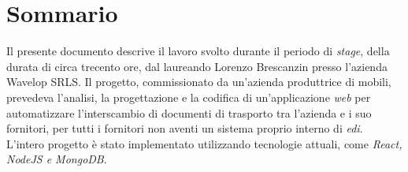 
\cleardoublepage
{}
{}
\begingroup
\let\clearpage\relax
\let\cleardoublepage\relax
\let\cleardoublepage\relax

\chapter*{Sommario}

Il presente documento descrive il lavoro svolto durante il periodo di \emph{stage}, della durata di circa trecento ore, dal laureando Lorenzo Brescanzin presso l'azienda Wavelop SRLS.
Il progetto, commissionato da un'azienda produttrice di mobili, prevedeva l'analisi, la progettazione e la codifica di un'applicazione \emph{web} per automatizzare l'interscambio di documenti di trasporto tra l'azienda e i suo fornitori, per tutti i fornitori non aventi un sistema proprio interno di \emph{\acrshort{edi}}.
L'intero progetto è stato implementato utilizzando tecnologie attuali, come \emph{React, NodeJS e MongoDB}.

%
%

\endgroup			

\vfill

